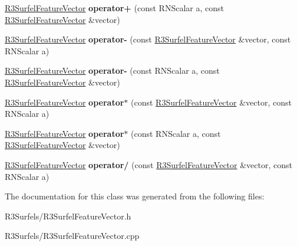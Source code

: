 \begin{DoxyCompactItemize}
\item 
\hyperlink{class_r3_surfel_feature_vector}{R3\+Surfel\+Feature\+Vector} {\bfseries operator+} (const R\+N\+Scalar a, const \hyperlink{class_r3_surfel_feature_vector}{R3\+Surfel\+Feature\+Vector} \&vector)\hypertarget{class_r3_surfel_feature_vector_a741489715d6bc54b69f3e549b700972e}{}\label{class_r3_surfel_feature_vector_a741489715d6bc54b69f3e549b700972e}

\item 
\hyperlink{class_r3_surfel_feature_vector}{R3\+Surfel\+Feature\+Vector} {\bfseries operator-\/} (const \hyperlink{class_r3_surfel_feature_vector}{R3\+Surfel\+Feature\+Vector} \&vector, const R\+N\+Scalar a)\hypertarget{class_r3_surfel_feature_vector_ad19d9086a1dd5aee08c9797114e72833}{}\label{class_r3_surfel_feature_vector_ad19d9086a1dd5aee08c9797114e72833}

\item 
\hyperlink{class_r3_surfel_feature_vector}{R3\+Surfel\+Feature\+Vector} {\bfseries operator-\/} (const R\+N\+Scalar a, const \hyperlink{class_r3_surfel_feature_vector}{R3\+Surfel\+Feature\+Vector} \&vector)\hypertarget{class_r3_surfel_feature_vector_a483c2c75780fe5f86d57d3b7c511e0b3}{}\label{class_r3_surfel_feature_vector_a483c2c75780fe5f86d57d3b7c511e0b3}

\item 
\hyperlink{class_r3_surfel_feature_vector}{R3\+Surfel\+Feature\+Vector} {\bfseries operator$\ast$} (const \hyperlink{class_r3_surfel_feature_vector}{R3\+Surfel\+Feature\+Vector} \&vector, const R\+N\+Scalar a)\hypertarget{class_r3_surfel_feature_vector_ac5970f106b1420d497ea548ddf8f3441}{}\label{class_r3_surfel_feature_vector_ac5970f106b1420d497ea548ddf8f3441}

\item 
\hyperlink{class_r3_surfel_feature_vector}{R3\+Surfel\+Feature\+Vector} {\bfseries operator$\ast$} (const R\+N\+Scalar a, const \hyperlink{class_r3_surfel_feature_vector}{R3\+Surfel\+Feature\+Vector} \&vector)\hypertarget{class_r3_surfel_feature_vector_acf085fc4481d28ce62f7304c44de36df}{}\label{class_r3_surfel_feature_vector_acf085fc4481d28ce62f7304c44de36df}

\item 
\hyperlink{class_r3_surfel_feature_vector}{R3\+Surfel\+Feature\+Vector} {\bfseries operator/} (const \hyperlink{class_r3_surfel_feature_vector}{R3\+Surfel\+Feature\+Vector} \&vector, const R\+N\+Scalar a)\hypertarget{class_r3_surfel_feature_vector_a0342309f9e5328bf273f04170ed4eb3a}{}\label{class_r3_surfel_feature_vector_a0342309f9e5328bf273f04170ed4eb3a}

\end{DoxyCompactItemize}


The documentation for this class was generated from the following files\+:\begin{DoxyCompactItemize}
\item 
R3\+Surfels/R3\+Surfel\+Feature\+Vector.\+h\item 
R3\+Surfels/R3\+Surfel\+Feature\+Vector.\+cpp\end{DoxyCompactItemize}
